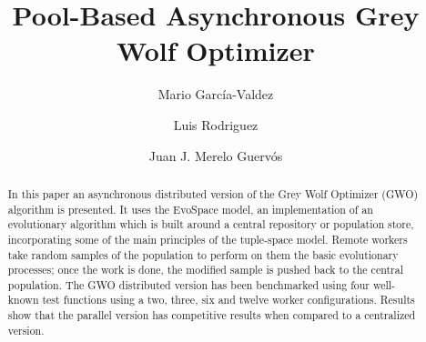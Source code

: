 \documentclass{llncs}
\begin{document}
\sloppy

\title{Pool-Based Asynchronous Grey Wolf Optimizer}

\author{Mario Garc\'ia-Valdez \and Luis Rodriguez \and Juan J. Merelo Guerv\'os}


\maketitle

\begin{abstract}
 

In this paper an asynchronous distributed version of 
    the Grey Wolf Optimizer (GWO) algorithm is presented. It uses the
    EvoSpace model, an implementation of an evolutionary algorithm which is
    built around a central repository or population store, incorporating some of 
    the main principles of the tuple-space model. Remote workers
	take random samples of the population to perform on them the basic evolutionary
	processes; once the work is done, the modified sample is pushed back to the 
	central population. The GWO distributed version has been benchmarked using 
	four well-known test functions using a two, three, six and twelve worker configurations. 
	Results show that the parallel version has competitive results when compared 
	to a centralized version. 
	



\end{abstract}
\end{document}
